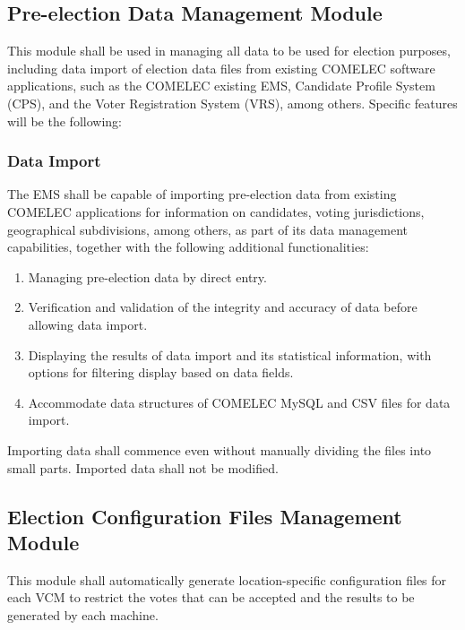 \documentclass[a4paper, 11pt]{article}
\begin{document}
\subsection{Pre-election Data Management Module}
This module shall be used in managing all data to be used for election purposes, including data import of election data files from existing COMELEC software applications, such as the COMELEC existing EMS, Candidate Profile System (CPS), and the Voter Registration System (VRS), among others. Specific features will be the following:
\subsubsection{Data Import}
The EMS shall be capable of importing pre-election data from existing COMELEC applications for information on candidates, voting jurisdictions, geographical subdivisions, among others, as part of its data management capabilities, together with the following additional functionalities:
\begin{enumerate}
	\item Managing pre-election data by direct entry.
	\item Verification and validation of the integrity and accuracy of data before allowing data import.
	\item Displaying the results of data import and its statistical information, with options for filtering display based on data fields.
	\item Accommodate data structures of COMELEC MySQL and CSV files for data import.
\end{enumerate}
Importing data shall commence even without manually dividing the files into small parts. Imported data shall not be modified.

\subsection{Election Configuration Files Management Module}
This module shall automatically generate location-specific configuration files for each VCM to restrict the votes that can be accepted and the results to be generated by each machine.
\end{document}
